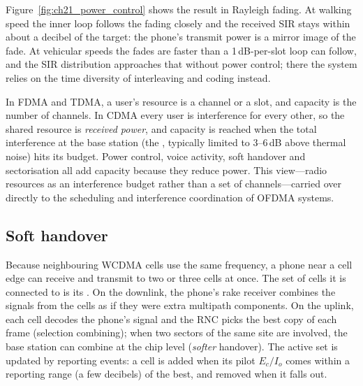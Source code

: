 Figure~\ref{fig:ch21_power_control} shows the result in Rayleigh fading. At walking speed the inner
loop follows the fading closely and the received SIR stays within about a decibel of the target: the
phone's transmit power is a mirror image of the fade. At vehicular speeds the fades are faster than a
1\,dB-per-slot loop can follow, and the SIR distribution approaches that without power control;
there the system relies on the time diversity of interleaving and coding instead.


\begin{keyidea}
In FDMA and TDMA, a user's resource is a channel or a slot, and capacity is the number of channels.
In CDMA every user is interference for every other, so the shared resource is \emph{received power},
and capacity is reached when the total interference at the base station (the ,
typically limited to 3--6\,dB above thermal noise) hits its budget. Power control, voice activity,
soft handover and sectorisation all add capacity because they reduce power. This view---radio
resources as an interference budget rather than a set of channels---carried over directly to the
scheduling and interference coordination of OFDMA systems.
\end{keyidea}

\subsection{Soft handover}

Because neighbouring WCDMA cells use the same frequency, a phone near a cell edge can receive and
transmit to two or three cells at once. The set of cells it is connected to is its
. On the downlink, the phone's rake receiver combines the signals from the cells as
if they were extra multipath components. On the uplink, each cell decodes the phone's signal and the
RNC picks the best copy of each frame (selection combining); when two sectors of the same site are
involved, the base station can combine at the chip level (\emph{softer} handover). The active set is
updated by reporting events: a cell is added when its pilot $E_c/I_o$ comes within a reporting range
(a few decibels) of the best, and removed when it falls out.

